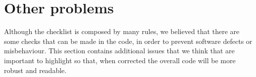 \break
\section{Other problems}
Although the checklist is composed by many rules, we believed that there are some checks that can be made in the code, in order to prevent software defects or misbehaviour. This section contains additional issues that we think that are important to highlight so that, when corrected the overall code will be more robust and readable.